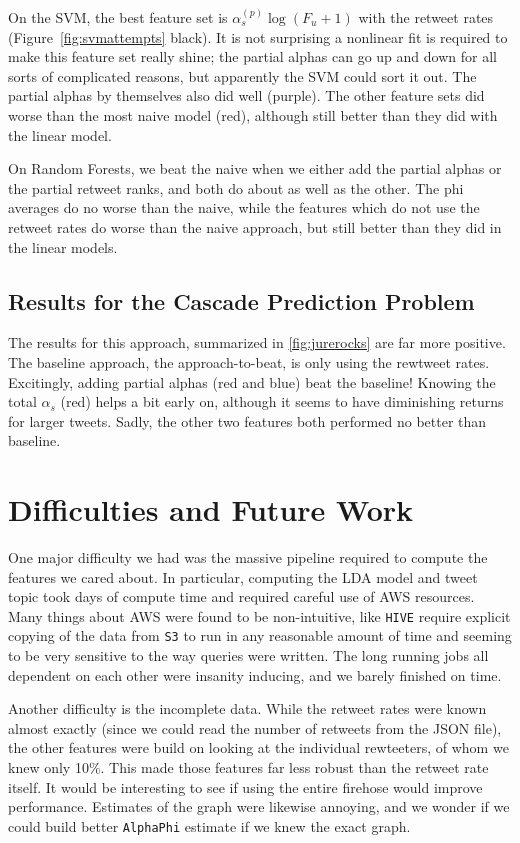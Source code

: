 On the SVM, the best feature set is $\alpha_s^{(p)}\log(F_u+1)$ with the retweet rates (Figure~\ref{fig:svmattempts} black).  
It is not surprising a nonlinear fit is required to make this feature set really shine; the partial alphas can go up and down for all sorts of complicated reasons, but apparently the SVM could sort it out.  
The partial alphas by themselves also did well (purple).  The other feature sets did worse than the most naive model (red), although still better than they did with the linear model.  

On Random Forests, we beat the naive when we either add the partial alphas or the partial retweet ranks, and both do about as well as the other.  The phi averages do no worse than the naive, while the features which do not use the retweet rates do worse than the naive approach, but still better than they did in the linear models.  

\subsection{Results for the Cascade Prediction Problem}

The results for this approach, summarized in \ref{fig:jurerocks} are far more positive.  
The baseline approach, the approach-to-beat, is only using the rewtweet rates.  
Excitingly, adding partial alphas (red and blue) beat the baseline!   Knowing the total $\alpha_s$ (red) helps a bit early on, although it seems to have diminishing returns for larger tweets.  
Sadly, the other two features both performed no better than baseline.

\section{Difficulties and Future Work}

One major difficulty we had was the massive pipeline required to compute the features we cared about.
In particular, computing the LDA model and tweet topic took days of compute time and required careful use of AWS resources.
Many things about AWS were found to be non-intuitive, like \texttt{HIVE} require explicit copying of the data from \texttt{S3} to run in any reasonable amount of time and seeming to be very sensitive to the way queries were written.
The long running jobs all dependent on each other were insanity inducing, and we barely finished on time.

Another difficulty is the incomplete data.
While the retweet rates were known almost exactly (since we could read the number of retweets from the JSON file), the other features were build on looking at the individual rewteeters, of whom we knew only 10\%.  This made those features far less robust than the retweet rate itself.
It would be interesting to see if using the entire firehose would improve performance.
Estimates of the graph were likewise annoying, and we wonder if we could build better \texttt{AlphaPhi} estimate if we knew the exact graph.

